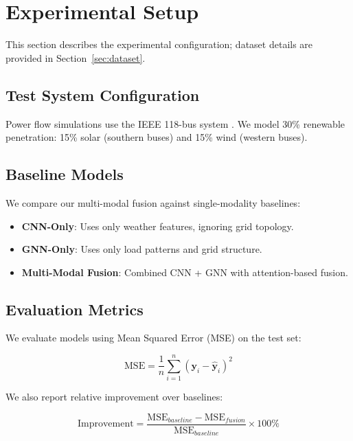 \documentclass[journal,12pt,onecolumn]{IEEEtran}
\begin{document}
\section{Experimental Setup}
\label{sec:experimental}

This section describes the experimental configuration; dataset details are provided in Section~\ref{sec:dataset}.

\subsection{Test System Configuration}

Power flow simulations use the IEEE 118-bus system \cite{ref23}. We model 30\% renewable penetration: 15\% solar (southern buses) and 15\% wind (western buses).

\subsection{Baseline Models}

We compare our multi-modal fusion against single-modality baselines:

\begin{itemize}
    \item \textbf{CNN-Only}: Uses only weather features, ignoring grid topology.
    \item \textbf{GNN-Only}: Uses only load patterns and grid structure.
    \item \textbf{Multi-Modal Fusion}: Combined CNN + GNN with attention-based fusion.
\end{itemize}

\subsection{Evaluation Metrics}

We evaluate models using Mean Squared Error (MSE) on the test set:

\begin{equation}
\text{MSE} = \frac{1}{n} \sum_{i=1}^{n} (\mathbf{y}_i - \hat{\mathbf{y}}_i)^2
\end{equation}

We also report relative improvement over baselines:

\begin{equation}
\text{Improvement} = \frac{\text{MSE}_{baseline} - \text{MSE}_{fusion}}{\text{MSE}_{baseline}} \times 100\%
\end{equation}
\end{document}
